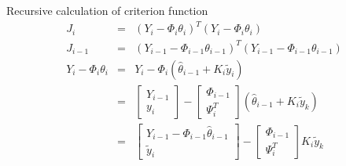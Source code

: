\begin{frame}{ Recursive calculation of criterion function }
\begin{eqnarray*}
J_{i} &=& (Y_i-\Phi_i\theta_i)^T (Y_i-\Phi_i\theta_i)   \\
J_{i-1} &=& (Y_{i-1}-\Phi_{i-1}\theta_{i-1})^T (Y_{i-1}-\Phi_{i-1}\theta_{i-1}) \\
Y_i-\Phi_i\theta_i &=& Y_i - \Phi_i (\hat\theta_{i-1}+K_i \tilde y_i) \\
&=& \begin{bmatrix}  Y_{i-1}  \\  y_i \end{bmatrix} -\begin{bmatrix}\Phi_{i-1} \\ \Psi_i^T \end{bmatrix} (\hat\theta_{i-1}+ K_i \tilde y_k)  \\
&=& \begin{bmatrix} Y_{i-1}-\Phi_{i-1}\hat\theta_{i-1}  \\ \tilde y_i \end{bmatrix} -\begin{bmatrix}\Phi_{i-1} \\ \Psi_i^T \end{bmatrix}  K_i \tilde y_k  \\
\end{eqnarray*}
\end{frame}

